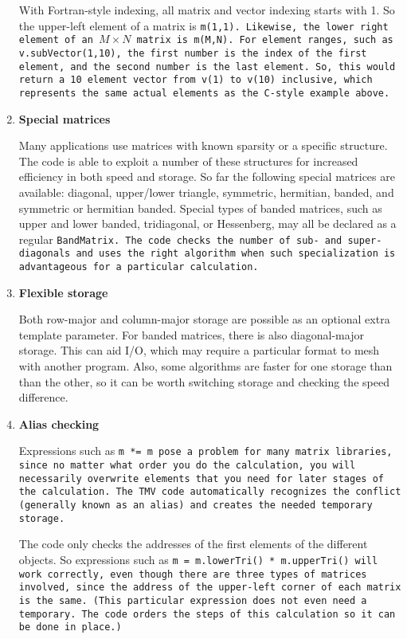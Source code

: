 \begin{enumerate}
With Fortran-style indexing, all matrix and vector indexing starts with 1.
So the upper-left element of a matrix is \tt{m(1,1)}.  Likewise, the lower right
element of an $M \times N$ matrix is \tt{m(M,N)}.  For element ranges, such as
\tt{v.subVector(1,10)}, the first number is the index of the first element, and
the second number is the last element.  So, this would return a 10 element vector
from \tt{v(1)} to \tt{v(10)} inclusive, which represents the same actual elements 
as the C-style example above.

\item
\textbf{Special matrices}

Many applications use matrices with known sparsity or a specific structure.  
The code is able to exploit a number of these structures for increased
efficiency in both speed and storage.  So far the following special matrices are
available: diagonal, upper/lower triangle, symmetric, hermitian, banded, and 
symmetric or hermitian banded.  
Special types of banded matrices, such as 
upper and lower banded, tridiagonal, or Hessenberg, may all be declared as a 
regular \tt{BandMatrix}.  The code checks the number of sub- and super-diagonals 
and uses the right algorithm when such specialization is advantageous for a 
particular calculation.

\item
\textbf{Flexible storage}

Both row-major and column-major storage are possible as an optional
extra template parameter.
For banded matrices, there is also diagonal-major storage.
This can aid I/O, which may require a particular format to mesh with another
program.  Also, some algorithms 
are faster for one storage than than the other, so it can be worth switching storage
and checking the speed difference.

\item
\textbf{Alias checking}

Expressions such as \tt{m *= m} pose a problem for many matrix libraries, since
no matter what order you do the calculation, you will necessarily overwrite elements 
that you need for later stages of the calculation.  
The TMV code automatically recognizes the
conflict (generally known as an alias) and creates the needed temporary storage.

The code only checks the addresses of the first elements of the different objects.
So expressions such as \tt{m = m.lowerTri() * m.upperTri()} will work
correctly, even though there are three types of matrices involved, since the 
address of the upper-left corner of each matrix is the same.  (This particular
expression does not even need a temporary.  The code orders the steps of this
calculation so it can be done in place.)


\end{enumerate}
